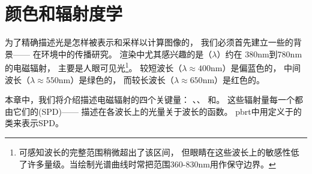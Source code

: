 \chapter{颜色和辐射度学}\label{chap:颜色和辐射度学}
\setcounter{sidenote}{1}

为了精确描述光是怎样被表示和采样以计算图像的，
我们必须首先建立一些的背景——
在环境中的传播研究。
渲染中尤其感兴趣的是（$\lambda$）约在
380nm到780nm的电磁辐射，
主要是人眼可见光\footnote{可感知波长的完整范围稍微超出了该区间，
但眼睛在这些波长上的敏感性低了许多量级。当绘制光谱曲线时常把范围360-830nm用作保守边界。}。
较短波长（$\lambda\approx400\text{nm}$）是偏蓝色的，
中间波长（$\lambda\approx550\text{nm}$）是绿色的，
而较长波长（$\lambda\approx650\text{nm}$）是红色的。

本章中，我们将介绍描述电磁辐射的四个关键量：
、、
和。
这些辐射量每一个都由它们的(SPD)——
描述在各波长上的光量关于波长的函数。
pbrt中用定义于的类来表示SPD。

















